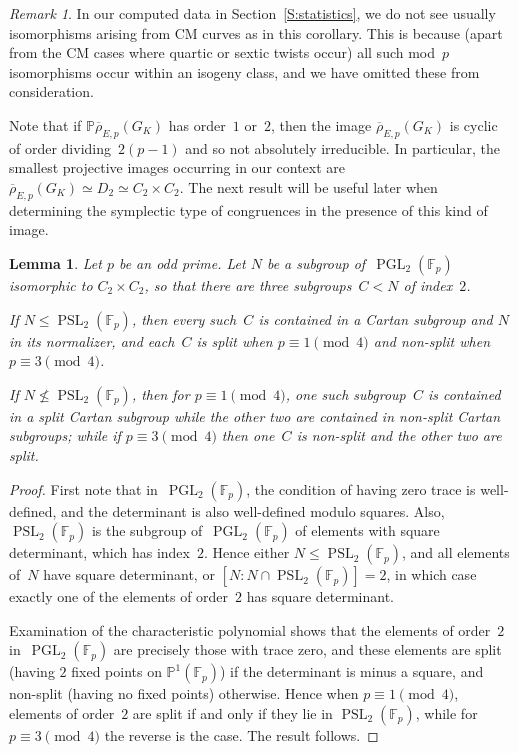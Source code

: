 \documentclass[12pt, reqno]{amsart}
\newcommand{\F}{\mathbb{F}}
\newcommand{\PP}{\mathbb{P}}
\newcommand{\rhobar}{{\overline{\rho}}}
\newcommand{\PGL}{\operatorname{PGL}}
\newcommand{\PSL}{\operatorname{PSL}}
\numberwithin{equation}{section}
\newtheorem{lemma}[theorem]{Lemma}
\theoremstyle{definition}
\theoremstyle{remark}
\newtheorem{remark}[theorem]{Remark}
\begin{document}
\begin{remark}
In our computed data in Section~\ref{S:statistics}, we do not see
usually isomorphisms arising from CM curves as in this corollary. This
is because (apart from the CM cases where quartic or sextic twists
occur) all such mod~$p$ isomorphisms occur within an isogeny class,
and we have omitted these from consideration.
\end{remark}



Note that if $\PP\rhobar_{E,p} (G_K)$ has order~$1$ or~$2$, then the image
$\rhobar_{E,p} (G_K)$ is cyclic of order dividing~$2(p-1)$ and so not absolutely irreducible. In particular, the smallest projective images occurring in our context
are $\rhobar_{E,p} (G_K) \simeq D_2 \simeq C_2 \times C_2$. The next
result will be useful later when determining the symplectic type of
congruences in the presence of this kind of image.

\begin{lemma}\label{L:C2xC2}
Let $p$ be an odd prime.  Let $N$ be a subgroup of~$\PGL_2(\F_p)$
isomorphic to $C_2\times C_2$, so that there are three subgroups~$C< N$
of index~$2$.

If $N\le\PSL_2(\F_p)$, then every such~$C$ is contained in a Cartan
subgroup and $N$ in its normalizer, and each~$C$ is split when
$p\equiv1\pmod4$ and non-split when $p\equiv3\pmod4$.

If $N\not\le\PSL_2(\F_p)$, then for $p\equiv1\pmod4$, one such
subgroup~$C$ is contained in a split Cartan subgroup while the other
two are contained in non-split Cartan subgroups; while if
$p\equiv3\pmod4$ then one~$C$ is non-split and the other two are
split.
\end{lemma}

\begin{proof}
  First note that in~$\PGL_2(\F_p)$, the condition of having zero
  trace is well-defined, and the determinant is also well-defined
  modulo squares.  Also, $\PSL_2(\F_p)$ is the subgroup of~$\PGL_2(\F_p)$ of elements with
  square determinant, which has index~$2$.  Hence either
  $N\le\PSL_2(\F_p)$, and all elements of~$N$ have square determinant,
  or $[N:N\cap\PSL_2(\F_p)]=2$, in which case exactly one of the
  elements of order~$2$ has square determinant.

  Examination of the characteristic polynomial shows that the elements
  of order~$2$ in~$\PGL_2(\F_p)$ are precisely those with trace zero,
  and these elements are split (having $2$ fixed points on
  $\PP^1(\F_p)$) if the determinant is minus a square, and non-split
  (having no fixed points) otherwise.  Hence when $p\equiv1\pmod4$,
  elements of order~$2$ are split if and only if they lie in
  $\PSL_2(\F_p)$, while for $p\equiv3\pmod4$ the reverse is the case.
  The result follows.
\end{proof}
\end{document}
